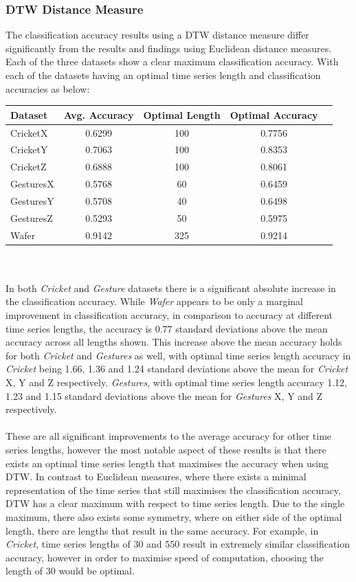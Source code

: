 \documentclass[10pt,a4paper]{article}
\newcommand{\head}[1]{\textnormal{\textbf{#1}}}
\begin{document}
\subsubsection{DTW Distance Measure}
The classification accuracy results using a DTW distance measure differ significantly from the results and findings using Euclidean distance measures.
Each of the three datasets show a clear maximum classification accuracy.
With each of the datasets having an optimal time series length and classification accuracies as below:\\

\begin{tabular}{lcccc}
\hline
\head{Dataset} & \head{Avg. Accuracy} & \head{Optimal Length} & \head{Optimal Accuracy}\\
\hline
CricketX & 0.6299 & 100 & 0.7756 \\
CricketY & 0.7063 & 100 & 0.8353 \\
CricketZ & 0.6888 & 100 & 0.8061 \\
\hline
GesturesX & 0.5768 & 60 & 0.6459 \\
GesturesY & 0.5708 & 40 & 0.6498 \\
GesturesZ & 0.5293 & 50 & 0.5975 \\
\hline
Wafer & 0.9142 & 325 & 0.9214 \\
\hline

\end{tabular}
\\\\
In both \textit{Cricket} and \textit{Gesture} datasets there is a significant absolute increase in the classification accuracy.
While \textit{Wafer} appears to be only a marginal improvement in classification accuracy, in comparison to accuracy at different time series lengths, the accuracy is 0.77 standard deviations above the mean accuracy across all lengths shown.
This increase above the mean accuracy holds for both \textit{Cricket} and \textit{Gestures} as well, with optimal time series length accuracy in \textit{Cricket} being 1.66, 1.36 and 1.24 standard deviations above the mean for \textit{Cricket} X, Y and Z respectively.
\textit{Gestures}, with optimal time series length accuracy 1.12, 1.23 and 1.15 standard deviations above the mean for \textit{Gestures} X, Y and Z respectively.
\\\\
These are all significant improvements to the average accuracy for other time series lengths, however the most notable aspect of these results is that there exists an optimal time series length that maximises the accuracy when using DTW.
In contrast to Euclidean measures, where there exists a minimal representation of the time series that still maximises the classification accuracy, DTW has a clear maximum with respect to time series length.
Due to the single maximum, there also exists some symmetry, where on either side of the optimal length, there are lengths that result in the same accuracy.
For example, in \textit{Cricket}, time series lengths of 30 and 550 result in extremely similar classification accuracy, however in order to maximise speed of computation, choosing the length of 30 would be optimal.
\\\\
\end{document}
